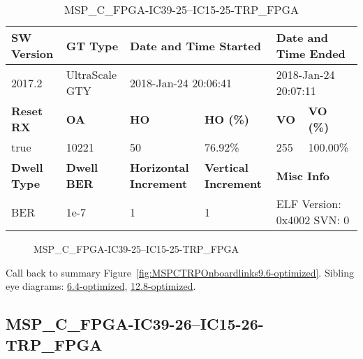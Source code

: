 \begin{table}[h]
\centering
\caption{MSP\_C\_FPGA-IC39-25--IC15-25-TRP\_FPGA}
\label{tab:MSPCFPGAIC3925IC1525TRPFPGA9.6-optimized}
\begin{tabular}{@{}|l|l|l|l|l|l|@{}}
\toprule
\textbf{SW Version}                & \textbf{GT Type}   & \multicolumn{2}{l|}{\textbf{Date and Time Started}}            & \multicolumn{2}{l|}{\textbf{Date and Time Ended}}        \\ \midrule
2017.2                       & UltraScale GTY          & \multicolumn{2}{l|}{2018-Jan-24 20:06:41}                   & \multicolumn{2}{l|}{2018-Jan-24 20:07:11}               \\ \midrule
\textbf{Reset RX}                  & \textbf{OA} & \textbf{HO}   & \textbf{HO (\%)} & \textbf{VO} & \textbf{VO (\%)} \\ \midrule
true & 10221        & 50          & 76.92\%        & 255        & 100.00\%       \\ \midrule
\textbf{Dwell Type}                & \textbf{Dwell BER} & \textbf{Horizontal Increment} & \textbf{Vertical Increment}    & \multicolumn{2}{l|}{\textbf{Misc Info}}                  \\ \midrule
BER                            & 1e-7        & 1        & 1           & \multicolumn{2}{l|}{ELF Version: 0x4002 SVN: 0}                         \\ \bottomrule
\end{tabular}
\end{table}

\begin{figure}[h]
\caption{MSP\_C\_FPGA-IC39-25--IC15-25-TRP\_FPGA} \label{fig:MSPCFPGAIC3925IC1525TRPFPGA9.6-optimized}
\end{figure}

Call back to summary Figure~\ref{fig:MSPCTRPOnboardlinks9.6-optimized}.
Sibling eye diagrams: \hyperref[sec:MSPCFPGAIC3925IC1525TRPFPGA6.4-optimized]{6.4-optimized}, \hyperref[sec:MSPCFPGAIC3925IC1525TRPFPGA12.8-optimized]{12.8-optimized}.

\clearpage
\newpage


\subsection{MSP\_C\_FPGA-IC39-26--IC15-26-TRP\_FPGA}\label{sec:MSPCFPGAIC3926IC1526TRPFPGA9.6-optimized}

